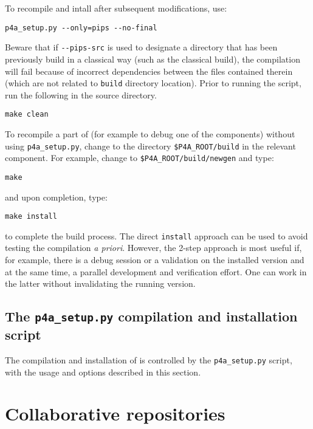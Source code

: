 \documentclass[a4paper]{article}
\begin{document}
To recompile and intall \Apips after subsequent modifications, use:
\begin{verbatim}
p4a_setup.py --only=pips --no-final
\end{verbatim}

Beware that if \verb|--pips-src| is used to designate a \Apips
directory that has been previously build in a classical way (such as
the classical \Asvn build), the compilation will fail because of
incorrect dependencies between the files contained therein (which are not
related to \Apfa \texttt{build} directory location). Prior to running
the script, run the following in the \Apips source directory.
\begin{verbatim}
make clean
\end{verbatim}

To recompile a part of \Apfa (for example to debug
one of the components) without using \verb|p4a_setup.py|, change to
the directory \verb|$P4A_ROOT/build| in the relevant component. For
example, change to \verb|$P4A_ROOT/build/newgen| and type:
\begin{verbatim}
make
\end{verbatim}
and upon completion, type:
\begin{verbatim}
make install
\end{verbatim}
to complete the build process. The direct \texttt{install}
approach can be used to avoid testing the compilation
\emph{a priori}. However, the 2-step
approach is most useful if, for example, there is a debug session or a
validation on the installed version and at the same time, a parallel
development and verification effort. One can work in the latter
without invalidating the running version.

\subsection{The \protect\texttt{p4a\_setup.py} compilation and installation
script}
\label{sec:p4a_s-comp-script}

The compilation and installation of \Apfa is controlled by the
\verb|p4a_setup.py| script, with the usage and options described in
this section.




\section{Collaborative repositories}
\label{sec:coll-repos}
\end{document}
